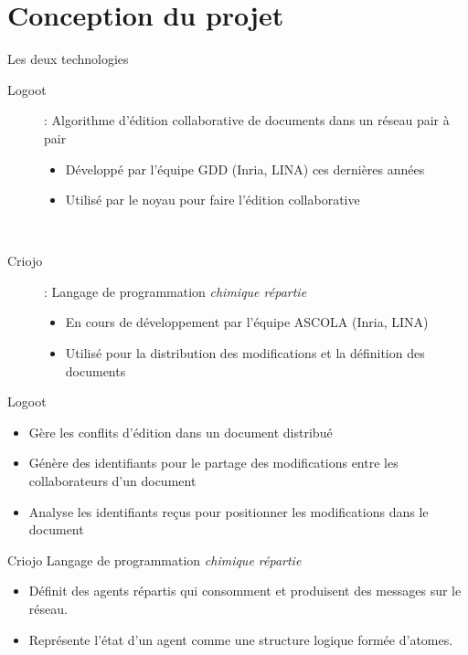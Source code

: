 \section{Conception du projet}
\begin{frame}{Les deux technologies}
\begin{description}
\item [Logoot] : Algorithme d'édition collaborative de documents dans un réseau
    pair à pair
  \begin{itemize}
    \item Développé par l'équipe GDD (Inria, LINA) ces dernières années
    \item Utilisé par le noyau pour faire l'édition collaborative
  \end{itemize} ~
\item [Criojo] : Langage de programmation \emph{chimique répartie}
  \begin{itemize}
    \item En cours de développement par l'équipe ASCOLA (Inria, LINA)
    \item Utilisé pour la distribution des modifications et la définition
    des documents
  \end{itemize}
\end{description}
\end{frame}

\begin{frame}{Logoot}
\begin{itemize}
  \item Gère les conflits d'édition dans un document distribué
  \item Génère des identifiants pour le partage des modifications entre les
  collaborateurs d'un document
  \item Analyse les identifiants reçus pour positionner les modifications dans
  le document
\end{itemize}
\end{frame}

\begin{frame}{Criojo}
Langage de programmation \emph{chimique répartie}
\begin{itemize}
  \item Définit des agents répartis qui consomment et produisent des messages
  sur le réseau.
  \item Représente l'état d'un agent comme une structure logique formée
  d'atomes.
\end{itemize}
\end{frame}

